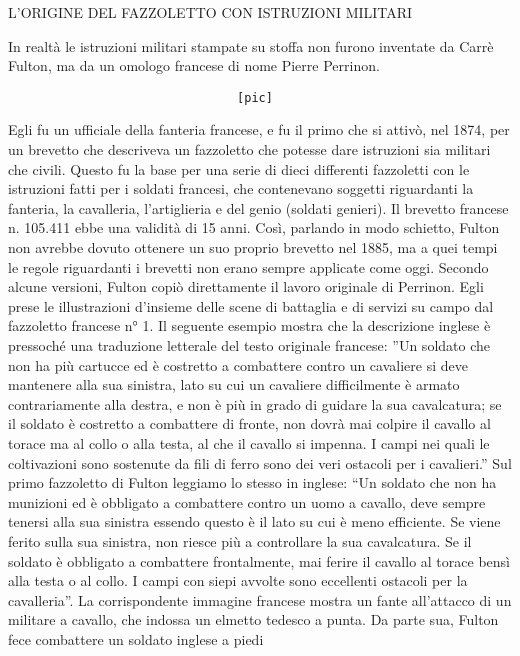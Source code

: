 L'ORIGINE DEL FAZZOLETTO CON ISTRUZIONI MILITARI

In realtà le istruzioni militari stampate su stoffa non furono inventate
da Carrè Fulton, ma da un omologo francese di nome Pierre Perrinon.

\begin{verbatim}
                                [pic]
\end{verbatim}

Egli fu un ufficiale della fanteria francese, e fu il primo che si
attivò, nel 1874, per un brevetto che descriveva un fazzoletto che
potesse dare istruzioni sia militari che civili. Questo fu la base per
una serie di dieci differenti fazzoletti con le istruzioni fatti per i
soldati francesi, che contenevano soggetti riguardanti la fanteria, la
cavalleria, l'artiglieria e del genio (soldati genieri). Il brevetto
francese n. 105.411 ebbe una validità di 15 anni. Così, parlando in modo
schietto, Fulton non avrebbe dovuto ottenere un suo proprio brevetto nel
1885, ma a quei tempi le regole riguardanti i brevetti non erano sempre
applicate come oggi. Secondo alcune versioni, Fulton copiò direttamente
il lavoro originale di Perrinon. Egli prese le illustrazioni d'insieme
delle scene di battaglia e di servizi su campo dal fazzoletto francese
n° 1. Il seguente esempio mostra che la descrizione inglese è pressoché
una traduzione letterale del testo originale francese: ''Un soldato che
non ha più cartucce ed è costretto a combattere contro un cavaliere si
deve mantenere alla sua sinistra, lato su cui un cavaliere difficilmente
è armato contrariamente alla destra, e non è più in grado di guidare la
sua cavalcatura; se il soldato è costretto a combattere di fronte, non
dovrà mai colpire il cavallo al torace ma al collo o alla testa, al che
il cavallo si impenna. I campi nei quali le coltivazioni sono sostenute
da fili di ferro sono dei veri ostacoli per i cavalieri.'' Sul primo
fazzoletto di Fulton leggiamo lo stesso in inglese: ``Un soldato che non
ha munizioni ed è obbligato a combattere contro un uomo a cavallo, deve
sempre tenersi alla sua sinistra essendo questo è il lato su cui è meno
efficiente. Se viene ferito sulla sua sinistra, non riesce più a
controllare la sua cavalcatura. Se il soldato è obbligato a combattere
frontalmente, mai ferire il cavallo al torace bensì alla testa o al
collo. I campi con siepi avvolte sono eccellenti ostacoli per la
cavalleria''. La corrispondente immagine francese mostra un fante
all'attacco di un militare a cavallo, che indossa un elmetto tedesco a
punta. Da parte sua, Fulton fece combattere un soldato inglese a piedi
